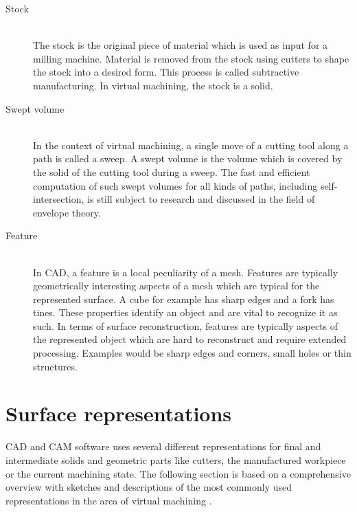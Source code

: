 \begin{description}
	\item[Stock] \hfill \\
	The stock is the original piece of material which is used as input for a milling machine.
	Material is removed from the stock using cutters to shape the stock into a desired form.
	This process is called subtractive manufacturing.
	In virtual machining, the stock is a solid.


	\item[Swept volume] \hfill \\
	In the context of virtual machining, a single move of a cutting tool along a path is called a sweep.
	A swept volume is the volume which is covered by the solid of the cutting tool during a sweep.
	The fast and efficient computation of such swept volumes for all kinds of paths, including self-intersection, is still subject to research and discussed in the field of envelope theory.


	\item[Feature] \hfill \\
	In CAD, a feature is a local peculiarity of a mesh.
	Features are typically geometrically interesting aspects of a mesh which are typical for the represented surface.
	A cube for example has sharp edges and a fork has tines.
	These properties identify an object and are vital to recognize it as such.
	In terms of surface reconstruction, features are typically aspects of the represented object which are hard to reconstruct and require extended processing.
	Examples would be sharp edges and corners, small holes or thin structures.

\end{description}

\section{Surface representations}
\label{sec:surface_representations}

CAD and CAM software uses several different representations for final and intermediate solids and geometric parts like cutters, the manufactured workpiece or the current machining state.
The following section is based on a comprehensive overview with sketches and descriptions of the most commonly used representations in the area of virtual machining \cite{virtual_machining_review}.

